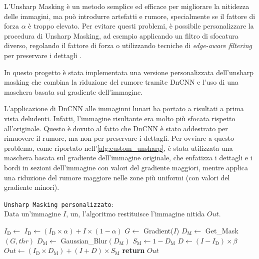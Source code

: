 L'Unsharp Masking è un metodo semplice ed efficace per migliorare la nitidezza delle immagini, ma può introdurre artefatti e rumore, specialmente se il fattore di forza $\alpha$ è troppo elevato. Per evitare questi problemi, è possibile personalizzare la procedura di Unsharp Masking, ad esempio applicando un filtro di sfocatura diverso, regolando il fattore di forza o utilizzando tecniche di \textit{edge-aware filtering} per preservare i dettagli \cite{unsharp_mask}.

In questo progetto è stata implementata una versione personalizzata dell'unsharp masking che combina la riduzione del rumore tramite DnCNN e l'uso di una maschera basata sul gradiente dell'immagine.

L'applicazione di DnCNN alle immaginni lunari ha portato a risultati a prima vista deludenti. Infatti, l'immagine risultante era molto più sfocata rispetto all'originale. Questo è dovuto al fatto che DnCNN è stato addestrato per rimuovere il rumore, ma non per preservare i dettagli. Per ovviare a questo problema, come riportato nell'\cref{alg:custom_unsharp}, è stata utilizzata una maschera basata sul gradiente dell'immagine originale, che enfatizza i dettagli e i bordi in sezioni dell'immagine con valori del gradiente maggiori, mentre applica una riduzione del rumore maggiore nelle zone più uniformi (con valori del gradiente minori).

\begin{algorithm} [H]
    \caption{\texttt{Unsharp Masking personalizzato}:\\ Data un'immagine $I$, un, l'algoritmo restituisce l'immagine nitida $Out$.} \label{alg:custom_unsharp}

    \begin{algorithmic}
            \State $I_{\text{D}} \gets$  
            \State $I_{\text{D}} \gets (I_{\text{D}} \times \alpha) + I \times (1-\alpha)$ 
            \State $G \gets$ Gradient($I$) 
            \State $D_{\text{M}} \gets$ Get\_Mask$(G, thr)$ 
            \State $D_{\text{M}} \gets$ Gaussian\_Blur$(D_{\text{M}})$ 
            \State $S_{\text{M}} \gets 1-D_{\text{M}}$ 
            \State $D \gets (I - I_{\text{D}}) \times \beta$ 
            \State $Out \gets (I_{\text{D}} \times D_{\text{M}}) + (I + D)\times S_{\text{M}}$ 
            \State \textbf{return} $Out$
        \EndFunction
    \end{algorithmic}
\end{algorithm}

